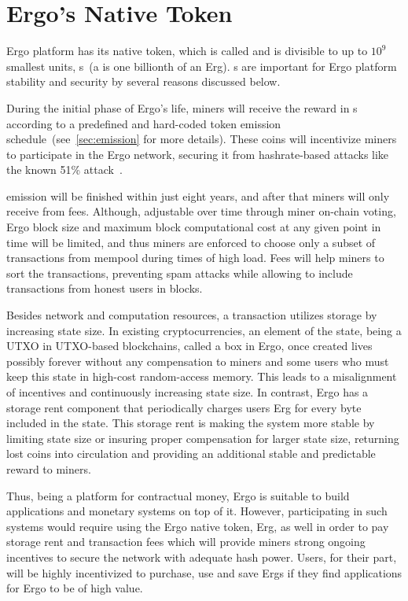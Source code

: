\section{Ergo's Native Token}
\label{sec:currency}

Ergo platform has its native token, which is
called \Erg{} and is divisible to up to $10^9$ smallest units, \nanoErg{}s~(a \nanoErg is one billionth of an Erg).
\Erg{}s are important for Ergo platform stability and security by several reasons discussed below.

During the initial phase of Ergo's life, miners will receive the reward in \Erg{}s
according to a predefined and hard-coded token emission schedule~(see~\ref{sec:emission} for more details).
These coins will incentivize miners to participate in the Ergo network, securing it from hashrate-based attacks
like the known 51\% attack~\cite{reorgAttack}.

\Erg{} emission will be finished within just eight years, and after that miners will only receive \Erg{} from
fees.
Although, adjustable over time through miner on-chain voting, Ergo block size and maximum block computational
cost at any given point in time will be limited,
and thus miners are enforced to
choose only a subset of transactions from mempool during times of high load.
Fees will help miners to sort the transactions, preventing spam attacks while allowing
to include transactions from honest users in blocks.

Besides network and computation resources, a transaction utilizes storage by increasing state size.
In existing cryptocurrencies, an element of the state, being  a UTXO  in  UTXO-based  blockchains,  called  a box
in  Ergo, once created lives possibly forever without any compensation to miners and some users who must keep this state
in high-cost random-access memory. This leads to a misalignment of incentives and continuously increasing state size.
In contrast, Ergo has a storage rent component that periodically charges users Erg for every byte
included in the state.
This storage rent is making the system more stable by limiting state size or insuring proper compensation for larger
state size, returning lost coins into
circulation and providing an additional stable and predictable reward to miners.

Thus, being a platform for contractual money, Ergo is suitable to build applications and monetary systems
on top of it.
However, participating in such systems would require using the Ergo native token, Erg, as well in order to pay
storage rent and transaction fees which will provide miners strong ongoing incentives to secure the network with
adequate hash power. Users, for their part, will be highly incentivized to purchase, use and save Ergs if they
find applications for Ergo to be of high value.

